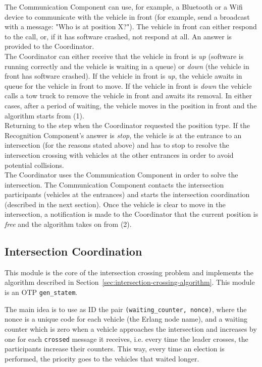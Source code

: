 \documentclass{memoir}
\begin{document}
The Communication Component can use, for example, a Bluetooth or a Wifi device to communicate with the vehicle in front (for example, send a broadcast with a message: "Who is at position X?"). The vehicle in front can either respond to the call, or, if it has software crashed, not respond at all. An answer is provided to the Coordinator.
\\

The Coordinator can either receive that the vehicle in front is \textit{up} (software is running correctly and the vehicle is waiting in a queue) or  \textit{down} (the vehicle in front has software crashed). If the vehicle in front is \textit{up}, the vehicle awaits in queue for the vehicle in front to move. If the vehicle in front is \textit{down} the vehicle calls a tow truck to remove the vehicle in front and awaits its removal.
In either cases, after a period of waiting, the vehicle moves in the position in front and the algorithm starts from (1).
\\

Returning to the step when the Coordinator requested the position type. If the Recognition Component’s answer is \textit{stop}, the vehicle is at the entrance to an intersection (for the reasons stated above) and has to stop to resolve the intersection crossing with vehicles at the other entrances in order to avoid potential collisions.
\\

The Coordinator uses the Communication Component in order to solve the intersection. The Communication Component contacts the intersection participants (vehicles at the entrances) and starts the intersection coordination (described in the next section). Once the vehicle is clear to move in the intersection, a notification is made to the Coordinator that the current position is \textit{free} and the algorithm takes on from (2).

\subsection{Intersection Coordination}
This module is the core of the intersection crossing problem and implements the algorithm described in Section~\ref{sec:intersection-crossing-algorithm}. This module is an OTP \verb|gen_statem|.

The main idea is to use as ID the pair \verb|(waiting_counter, nonce)|, where the nonce is a unique code for each vehicle (the Erlang node name), and a waiting counter which is zero when a vehicle approaches the intersection and increases by one for each \verb|crossed| message it receives, i.e. every time the leader crosses, the participants increase their counters. This way, every time an election is performed, the priority goes to the vehicles that waited longer. 
\end{document}
